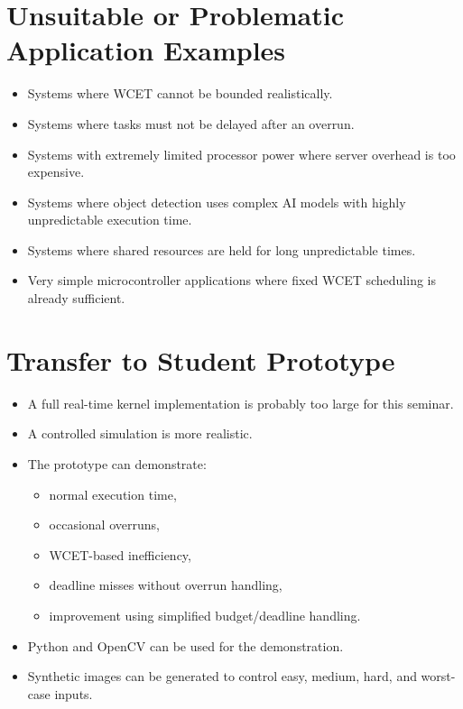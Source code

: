 \documentclass[a4paper,11pt]{article}
\begin{document}
\section*{Unsuitable or Problematic Application Examples}

\begin{itemize}
    \item Systems where WCET cannot be bounded realistically.
    \item Systems where tasks must not be delayed after an overrun.
    \item Systems with extremely limited processor power where server overhead is too expensive.
    \item Systems where object detection uses complex AI models with highly unpredictable execution time.
    \item Systems where shared resources are held for long unpredictable times.
    \item Very simple microcontroller applications where fixed WCET scheduling is already sufficient.
\end{itemize}

\section*{Transfer to Student Prototype}

\begin{itemize}
    \item A full real-time kernel implementation is probably too large for this seminar.
    \item A controlled simulation is more realistic.
    \item The prototype can demonstrate:
    \begin{itemize}
        \item normal execution time,
        \item occasional overruns,
        \item WCET-based inefficiency,
        \item deadline misses without overrun handling,
        \item improvement using simplified budget/deadline handling.
    \end{itemize}
    \item Python and OpenCV can be used for the demonstration.
    \item Synthetic images can be generated to control easy, medium, hard, and worst-case inputs.
\end{itemize}
\end{document}
